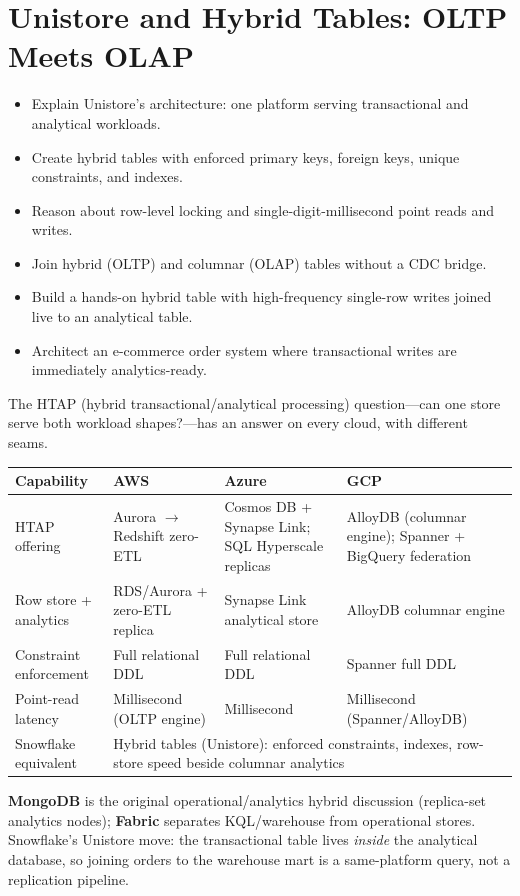 \chapter{Unistore and Hybrid Tables: OLTP Meets OLAP}
%
\begin{objectives}
\begin{itemize}
    \item Explain Unistore's architecture: one platform serving transactional and analytical workloads.
    \item Create hybrid tables with enforced primary keys, foreign keys, unique constraints, and indexes.
    \item Reason about row-level locking and single-digit-millisecond point reads and writes.
    \item Join hybrid (OLTP) and columnar (OLAP) tables without a CDC bridge.
    \item Build a hands-on hybrid table with high-frequency single-row writes joined live to an analytical table.
    \item Architect an e-commerce order system where transactional writes are immediately analytics-ready.
\end{itemize}
\end{objectives}

\begin{crosscloud}
The HTAP (hybrid transactional/analytical processing) question---can one store serve both workload shapes?---has an answer on every cloud, with different seams.

\vspace{2mm}
{\footnotesize
\begin{tabular}{@{}p{2.8cm}p{3.0cm}p{3.0cm}p{3.0cm}@{}}
\toprule
\textbf{Capability} & \textbf{AWS} & \textbf{Azure} & \textbf{GCP} \\
\midrule
HTAP offering & Aurora $\rightarrow$ Redshift zero-ETL & Cosmos DB + Synapse Link; SQL Hyperscale replicas & AlloyDB (columnar engine); Spanner + BigQuery federation \\
Row store + analytics & RDS/Aurora + zero-ETL replica & Synapse Link analytical store & AlloyDB columnar engine \\
Constraint enforcement & Full relational DDL & Full relational DDL & Spanner full DDL \\
Point-read latency & Millisecond (OLTP engine) & Millisecond & Millisecond (Spanner/AlloyDB) \\
\addlinespace
Snowflake equivalent & \multicolumn{3}{l}{Hybrid tables (Unistore): enforced constraints, indexes, row-store speed beside columnar analytics} \\
\bottomrule
\end{tabular}}

\vspace{1mm}
\textbf{MongoDB} is the original operational/analytics hybrid discussion (replica-set analytics nodes); \textbf{Fabric} separates KQL/warehouse from operational stores. Snowflake's Unistore move: the transactional table lives \emph{inside} the analytical database, so joining orders to the warehouse mart is a same-platform query, not a replication pipeline.
\end{crosscloud}


